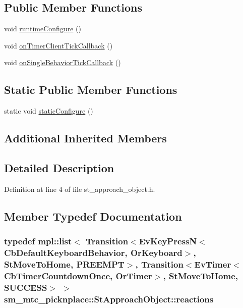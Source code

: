 \subsection*{Public Member Functions}
\begin{DoxyCompactItemize}
\item 
void \hyperlink{structsm__mtc__picknplace_1_1StApproachObject_a4f214c483a0a4f6425787700fec46f2f}{runtime\+Configure} ()
\item 
void \hyperlink{structsm__mtc__picknplace_1_1StApproachObject_a782b8ba006150f36c2e7e58c938a555e}{on\+Timer\+Client\+Tick\+Callback} ()
\item 
void \hyperlink{structsm__mtc__picknplace_1_1StApproachObject_ab9d80cae28bbca602d73caf2045820a0}{on\+Single\+Behavior\+Tick\+Callback} ()
\end{DoxyCompactItemize}
\subsection*{Static Public Member Functions}
\begin{DoxyCompactItemize}
\item 
static void \hyperlink{structsm__mtc__picknplace_1_1StApproachObject_af4be0424aa096166d80d45c4b9e78719}{static\+Configure} ()
\end{DoxyCompactItemize}
\subsection*{Additional Inherited Members}


\subsection{Detailed Description}


Definition at line 4 of file st\+\_\+approach\+\_\+object.\+h.



\subsection{Member Typedef Documentation}
\subsubsection[{\texorpdfstring{reactions}{reactions}}]{\setlength{\rightskip}{0pt plus 5cm}typedef mpl\+::list$<$ Transition$<$Ev\+Key\+PressN$<$Cb\+Default\+Keyboard\+Behavior, {\bf Or\+Keyboard}$>$, {\bf St\+Move\+To\+Home}, {\bf P\+R\+E\+E\+M\+PT}$>$, Transition$<$Ev\+Timer$<$Cb\+Timer\+Countdown\+Once, {\bf Or\+Timer}$>$, {\bf St\+Move\+To\+Home}, {\bf S\+U\+C\+C\+E\+SS}$>$ $>$ {\bf sm\+\_\+mtc\+\_\+picknplace\+::\+St\+Approach\+Object\+::reactions}}\hypertarget{structsm__mtc__picknplace_1_1StApproachObject_aae05e89333731410b01b87157f8387f4}{}\label{structsm__mtc__picknplace_1_1StApproachObject_aae05e89333731410b01b87157f8387f4}


